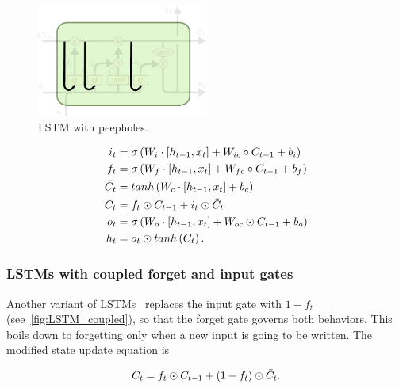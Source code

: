 \begin{figure}[t]
    \centering
    \includegraphics[width=0.5\textwidth]{pdf/LSTM_peepholes.pdf}
    \caption{LSTM with peepholes.\label{fig:LSTM_peepholes}}
\end{figure}

\begin{equation}\label{eq:LSTM_peepholes}
\begin{split}
    i_t &= \sigma\left(W_i \cdot \left[h_{t-1}, x_t\right] +
        W_{ic} \circ C_{t-1} + b_i \right)\\
    f_t &= \sigma\left(W_f \cdot \left[h_{t-1}, x_t\right] +
        W_{fc} \circ C_{t-1} + b_f \right)\\
    \tilde C_t &= tanh \left(W_c \cdot \left[h_{t-1}, x_t\right] +
        b_c \right)\\
    C_t &= f_t \odot C_{t-1} + i_t \odot \tilde C_t\\
    o_t &= \sigma\left(W_o \cdot \left[h_{t-1}, x_t\right] +
        W_{oc} \odot C_{t-1} + b_o \right)\\
    h_t &= o_t \odot tanh \left(C_t\right).
\end{split}
\end{equation}


\subsubsection{LSTMs with coupled forget and input gates}\label{sec:LSTM_coupled}

Another variant of LSTMs~\citep{Greff-et-al-arxiv2015} replaces the input gate
with $1 - f_t$ (see~\autoref{fig:LSTM_coupled}), so that the forget gate governs
both behaviors. This boils down to forgetting only when a new
input is going to be written. The modified state update equation is

\begin{equation}\label{eq:LSTM_coupled}
    C_t = f_t \odot C_{t-1} + (1 - f_t) \odot \tilde C_t.
\end{equation}

